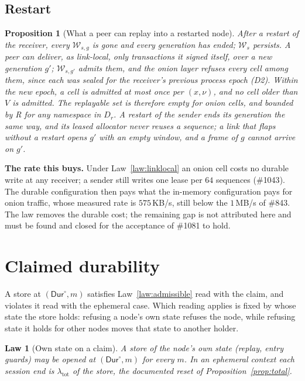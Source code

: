 \documentclass[journal]{IEEEtran}
\newtheorem{law}{Law}
\newtheorem{proposition}{Proposition}
\newcommand{\Durable}{\mathsf{Dur}}
\newcommand{\W}{\mathcal{W}}
\newcommand{\issue}[1]{\#{#1}}
\begin{document}
\subsection{Restart}

\begin{proposition}[What a peer can replay into a restarted node]\label{prop:llrestart}
After a restart of the receiver, every $\W_{s,g}$ is gone and every generation has ended;
$\W_s$ persists.  A peer can deliver, as link-local, only transactions it signed itself, over
a new generation $g'$; $\W_{s,g'}$ admits them, and the onion layer refuses every cell among
them, since each was sealed for the receiver's previous process epoch (D2).  Within the new
epoch, a cell is admitted at most once per $(x,\nu)$, and no cell older than $V$ is admitted.
The replayable set is therefore empty for onion cells, and bounded by R for any namespace in
$D_r$.  A restart of the sender ends its generation the same way, and its leased allocator
never reuses a sequence; a link that flaps without a restart opens $g'$ with an empty window,
and a frame of $g$ cannot arrive on $g'$.
\end{proposition}

\textbf{The rate this buys.}  Under Law~\ref{law:linklocal} an onion cell costs no durable write at any receiver; a
sender still writes one lease per $64$ sequences (\issue{1043}).  The durable configuration
then pays what the in-memory configuration pays for onion traffic, whose measured rate is
$575$\,KB/s, still below the $1$\,MB/s of \issue{843}.  The law removes the durable cost; the
remaining gap is not attributed here and must be found and closed for the acceptance of
\issue{1081} to hold.

\section{Claimed durability}\label{sec:claimed}

A store at $(\Durable^{\circ},m)$ satisfies Law~\ref{law:admissible} read with the claim,
and violates it read with the ephemeral case.  Which reading applies is fixed by whose state
the store holds: refusing a node's own state refuses the node, while refusing state it holds
for other nodes moves that state to another holder.

\begin{law}[Own state on a claim]\label{law:ownclaim}
A store of the node's own state (replay, entry guards) may be opened at
$(\Durable^{\circ},m)$ for every $m$.  In an ephemeral context each session end is
$\lambda_{\mathrm{tot}}$ of the store, the documented reset of Proposition~\ref{prop:total}.
\end{law}
\end{document}
